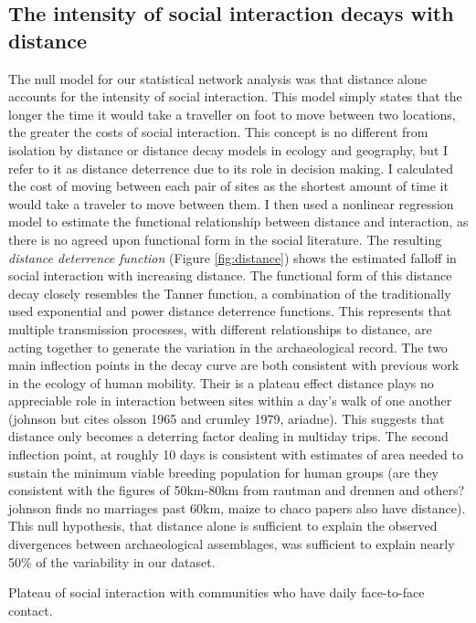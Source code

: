\documentclass[11pt]{wlscirep}
\begin{document}
\subsection*{The intensity of social interaction decays with distance}
The null model for our statistical network analysis was that distance alone accounts for the intensity of social interaction. This model simply states that the longer the time it would take a traveller on foot to move between two locations, the greater the costs of social interaction. This concept is no different from isolation by distance or distance decay models in ecology and geography, but I refer to it as distance deterrence due to its role in decision making. I calculated the cost of moving between each pair of sites as the shortest amount of time it would take a traveler to move between them. I then used a nonlinear regression model to estimate the functional relationship between distance and interaction, as there is no agreed upon functional form in the social literature. 
The resulting \textit{distance deterrence function} (Figure \ref{fig:distance}) shows the estimated falloff in social interaction with increasing distance. The functional form of this distance decay closely resembles the Tanner function, a combination of the traditionally used exponential and power distance deterrence functions. This represents that multiple transmission processes, with different relationships to distance, are acting together to generate the variation in the archaeological record. The two main inflection points in the decay curve are both consistent with previous work in the ecology of human mobility. Their is a plateau effect distance plays no appreciable role in interaction between sites within a day's walk of one another (johnson but cites olsson 1965 and crumley 1979, ariadne). This suggests that distance only becomes a deterring factor dealing in multiday trips. The second inflection point, at roughly 10 days is consistent with estimates of area needed to sustain the minimum viable breeding population for human groups (are they consistent with the figures of 50km-80km from rautman and drennen and others? johnson finds no marriages past 60km, maize to chaco papers also have distance). This null hypothesis, that distance alone is sufficient to explain the observed divergences between archaeological assemblages, was sufficient to explain nearly 50\% of the variability in our dataset.  

Plateau of social interaction with communities who have daily face-to-face contact.
\end{document}
